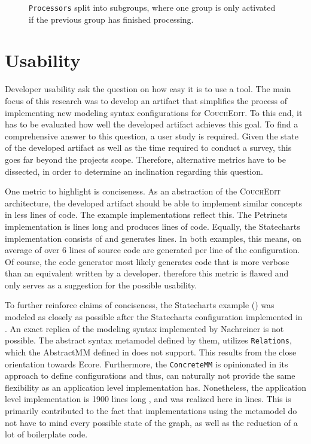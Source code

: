 \begin{figure}
  \centering
  
  \caption{\texttt{Processors} split into subgroups, where one group is only activated if the previous group has finished processing.}
  \label{fig:sub-groups}
\end{figure}

\section{Usability}
Developer usability ask the question on how easy it is to use a tool. The main focus of this research was to develop an artifact that simplifies the process of implementing new modeling syntax configurations for \textsc{CouchEdit}. To this end, it has to be evaluated how well the developed artifact achieves this goal. To find a comprehensive answer to this question, a user study is required. Given the state of the developed artifact as well as the time required to conduct a survey, this goes far beyond the projects scope. Therefore, alternative metrics have to be dissected, in order to determine an inclination regarding this question.

One metric to highlight is conciseness. As an abstraction of the \textsc{CouchEdit} architecture, the developed artifact should be able to implement similar concepts in less lines of code. The example implementations reflect this. The Petrinets implementation is \petriConfigLoC lines long and produces \petriGeneratedLoC lines of code. Equally, the Statecharts implementation consists of \stateConfigLoC and generates \stateGeneratedLoC lines. In both examples, this means, on average of over 6 lines of source code are generated per line of the configuration. Of course, the code generator most likely generates code that is more verbose than an equivalent written by a developer. therefore this metric is flawed and only serves as a suggestion for the possible usability.

To further reinforce claims of conciseness, the Statecharts example () was modeled as closely as possible after the Statecharts configuration implemented in \cite{nachreiner_couchedit_2020}. An exact replica of the modeling syntax implemented by Nachreiner is not possible. The abstract syntax metamodel defined by them, utilizes \texttt{Relations}, which the AbstractMM defined in  does not support. This results from the close orientation towards Ecore. Furthermore, the \texttt{ConcreteMM} is opinionated in its approach to define configurations and thus, can naturally not provide the same flexibility as an application level implementation has. Nonetheless, the application level implementation is 1900 lines long \cite{nachreiner_couchedit_2020}, and was realized here in \stateConfigLoC lines. This is primarily contributed to the fact that implementations using the metamodel do not have to mind every possible state of the graph, as well as the reduction of a lot of boilerplate code.

